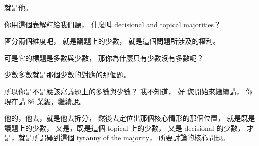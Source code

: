 \hypertarget{w06:cue:3040}{}就是他。

\hypertarget{w06:cue:3041}{}你用這個表解釋給我們聽，
\hypertarget{w06:cue:3042}{}什麼叫 decisional and topical majorities？

\hypertarget{w06:cue:3043}{}區分兩個維度吧，
\hypertarget{w06:cue:3044}{}就是議題上的少數，
\hypertarget{w06:cue:3045}{}就是這個問題所涉及的權利。

\hypertarget{w06:cue:3046}{}可是它的標題是多數與少數，
\hypertarget{w06:cue:3047}{}那你為什麼只有少數沒有多數呢？

\hypertarget{w06:cue:3048}{}少數多數就是那個少數的對應的那個題。

\hypertarget{w06:cue:3049}{}所以你是不是應該寫議題上的多數與少數？
\hypertarget{w06:cue:3050}{}我不知道，
\hypertarget{w06:cue:3051}{}好 您開始來繼續講，
\hypertarget{w06:cue:3052}{}你現在講 86 業級，繼續說。

\hypertarget{w06:cue:3053}{}他的，他去，就是他去拆分，
\hypertarget{w06:cue:3054}{}然後去定位出那個核心情形的那個位置，
\hypertarget{w06:cue:3055}{}就是既是議題上的少數，
\hypertarget{w06:cue:3056}{}又是，既是這個 topical 上的少數，
\hypertarget{w06:cue:3057}{}又是 decisional 的少數，
\hypertarget{w06:cue:3058}{}才是，就是所謂碰到這個 tyranny of the majority，
\hypertarget{w06:cue:3059}{}所要討論的核心問題。

